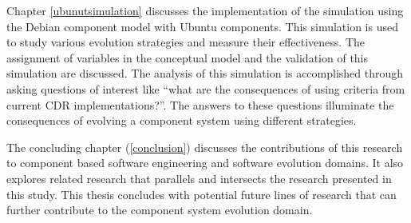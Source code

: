 Chapter \ref{ubunutsimulation} discusses the implementation of the simulation using the Debian component model \citep{Barth2005} with Ubuntu \citep{Hill2006} components. 
This simulation is used to study various evolution strategies and measure their effectiveness.
The assignment of variables in the conceptual model and the validation of this simulation are discussed.
The analysis of this simulation is accomplished through asking questions of interest like ``what are the consequences of using criteria from current CDR implementations?''.
The answers to these questions illuminate the consequences of evolving a component system using different strategies.

The concluding chapter (\ref{conclusion}) discusses the contributions of this research to component based software engineering and software evolution domains.
It also explores related research that parallels and intersects the research presented in this study.
This thesis concludes with potential future lines of research that can further contribute to the component system evolution domain. 